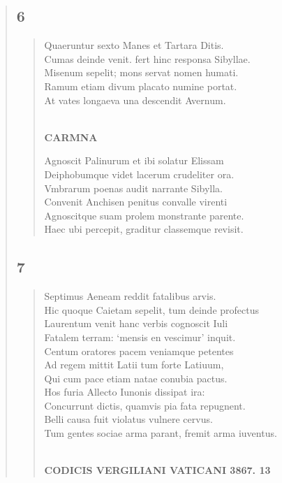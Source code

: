 \documentclass[11pt, a4paper]{report}
\begin{document}
\begin{verse}
  \subsection*{6}
      \begin{verse}
      Quaeruntur sexto Manes et Tartara Ditis. \\ Cumas deinde venit. fert hinc responsa Sibyllae. \\ Misenum sepelit; mons servat nomen humati. \\ Ramum etiam divum placato numine portat. \\ At vates longaeva una descendit Avernum. \\ 
        ﻿\pagebreak 
    \begin{center} \textbf{CARMNA} \end{center} \marginpar{[10]} Agnoscit Palinurum et ibi solatur Elissam \\ Deiphobumque videt lacerum crudeliter ora. \\ Vmbrarum poenas audit narrante Sibylla. \\ Convenit Anchisen penitus convalle virenti \\ Agnoscitque suam prolem monstrante parente. \\ Haec ubi percepit, graditur classemque revisit. \\ 
      \end{verse}
  \subsection*{7}
      \begin{verse}
      Septimus Aeneam reddit fatalibus arvis. \\ Hic quoque Caietam sepelit, tum deinde profectus \\ Laurentum venit hanc verbis cognoscit Iuli \\ Fatalem terram: ‘mensis en vescimur’ inquit. \\ Centum oratores pacem veniamque petentes \\ Ad regem mittit Latii tum forte Latiuum, \\ Qui cum pace etiam natae conubia pactus. \\ Hos furia Allecto Iunonis dissipat ira: \\ Concurrunt dictis, quamvis pia fata repugnent. \\ Belli causa fuit violatus vulnere cervus. \\ Tum gentes sociae arma parant, fremit arma iuventus. \\ 
        ﻿\pagebreak 
    \begin{center} \textbf{CODICIS VERGILIANI VATICANI 3867. 13} \end{center}
      \end{verse}

\end{verse}
\end{document}

